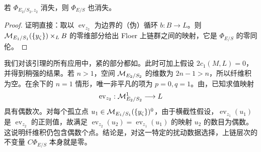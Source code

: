 \begin{lemma}\label{st:17.7}
若 $\Phi_{E_2/S_2,z_2}$ 消失，则 $\Phi_{E/S}$ 也消失。
\end{lemma}
\begin{proof}
证明直接：取以 $\operatorname{ev}_{z_2}$ 为边界的（伪）循环 $b:B\to L$。则 $\mathcal M_{E_1/S_1}(\{y_\zeta\})\times_L B$ 的零维部分给出 Floer 上链群之间的映射，它是 $\Phi_{E/S}$ 的零同伦。
\end{proof}

\clearpage
{}\begin{note}\label{st:17.8}
我们对该引理的所有应用中，紧的部分都如。此时可加上假设 $2c_1(M,L)=0$，并得到稍强的结果。若 $n>1$，空间 $\mathcal M_{E_2/S_2}$ 的维数为 $2n-1>n$，所以纤维积为空。在余下的 $n=1$ 情形，唯一非平凡的项为 $p=0,q=1$。由，已知求值映射
\[
\operatorname{ev}_{z_2}:\mathcal M_{E_2/S_2}^1\longrightarrow L
\]
具有偶数次。对每个孤立点 $u_1\in\mathcal M_{E_1/S_1}(\{y_\zeta\})^0$，由于横截性假设，$\operatorname{ev}_{z_1}(u_1)$ 是 $\operatorname{ev}_{z_2}$ 的正则值，故满足 $\operatorname{ev}_{z_2}(u_2)=\operatorname{ev}_{z_1}(u_1)$ 的映射 $u_2$ 的数目为偶数。这说明纤维积仍包含偶数个点。结论是，对这一特定的扰动数据选择，上链层次的不变量 $C\Phi_{E/S}$ 本身就是零。
\end{note}
